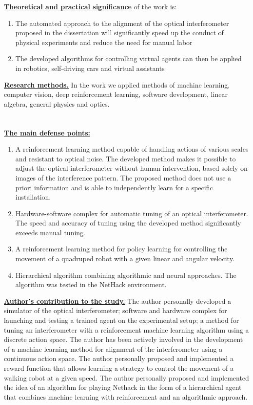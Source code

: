 \underline{\textbf{Theoretical and practical significance}} of the work is:
\begin{enumerate}[beginpenalty=10000] %
  \item The automated approach to the alignment of the optical interferometer proposed in the dissertation will significantly speed up the conduct of physical experiments and reduce the need for manual labor
  \item The developed algorithms for controlling virtual agents can then be applied in robotics, self-driving cars and virtual assistants
\end{enumerate}

\underline{\textbf{Research methods.}} In the work we applied methods of machine learning, computer vision, deep reinforcement learning, software development, linear algebra, general physics and optics.

\section*{}

\underline{\textbf{The main defense points:}}
\begin{enumerate}[beginpenalty=10000] %
  \item A reinforcement learning method capable of handling actions of various scales and resistant to optical noise. The developed method makes it possible to adjust the optical interferometer without human intervention, based solely on images of the interference pattern. The proposed method does not use a priori information and is able to independently learn for a specific installation.
  \item Hardware-software complex for automatic tuning of an optical interferometer. The speed and accuracy of tuning using the developed method significantly exceeds manual tuning.
  \item A reinforcement learning method for policy learning for controlling the movement of a quadruped robot with a given linear and angular velocity.
  \item Hierarchical algorithm combining algorithmic and neural approaches. The algorithm was tested in the NetHack environment.
\end{enumerate}

\underline{\textbf{Author’s contribution to the study.}} The author personally developed a simulator of the optical interferometer; software and hardware complex for launching and testing a trained agent on the experimental setup; a method for tuning an interferometer with a reinforcement machine learning algorithm using a discrete action space. The author has been actively involved in the development of a machine learning method for alignment of the interferometer using a continuous action space. The author personally proposed and implemented a reward function that allows learning a strategy to control the movement of a walking robot at a given speed. The author personally proposed and implemented the idea of an algorithm for playing Nethack in the form of a hierarchical agent that combines machine learning with reinforcement and an algorithmic approach. 

